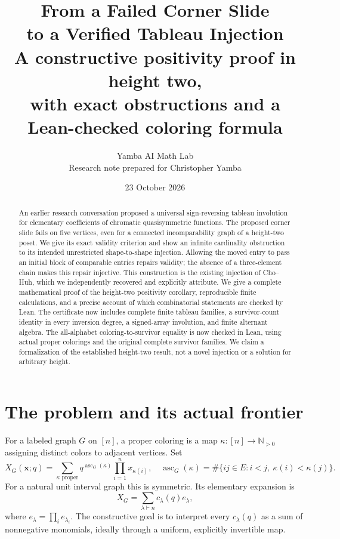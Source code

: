 \documentclass[11pt,a4paper]{article}
\title{\textcolor{ink}{From a Failed Corner Slide\\to a Verified Tableau Injection}\\[3mm]
\large A constructive positivity proof in height two,\\with exact obstructions and a Lean-checked coloring formula}
\author{Yamba AI Math Lab\\\small Research note prepared for Christopher Yamba}
\date{23 October 2026}
\theoremstyle{definition}
\newcommand{\N}{\mathbb N}
\begin{document}
\maketitle
\begin{abstract}
An earlier research conversation proposed a universal sign-reversing tableau
involution for elementary coefficients of chromatic quasisymmetric functions.
The proposed corner slide fails on five vertices, even for a connected
incomparability graph of a height-two poset. We give its exact validity
criterion and show an infinite cardinality obstruction to its intended
unrestricted shape-to-shape injection. Allowing the moved entry to pass an
initial block of comparable entries repairs validity; the absence of a
three-element chain makes this repair injective. This construction is the
existing injection of Cho--Huh, which we independently recovered and explicitly
attribute. We give a complete mathematical proof of the height-two positivity
corollary, reproducible finite calculations, and a precise account of which
combinatorial statements are checked by Lean. The certificate now includes
complete finite tableau families, a survivor-count identity in every
inversion degree, a signed-array involution, and finite alternant algebra.
The all-alphabet coloring-to-survivor equality is now checked in Lean, using
actual proper colorings and the original complete survivor families. We claim
a formalization of the established height-two result, not a novel injection
or a solution for arbitrary height.
\end{abstract}

\begin{center}
\end{center}

\section{The problem and its actual frontier}

For a labeled graph $G$ on $[n]$, a proper coloring is a map
$\kappa:[n]\to\N_{>0}$ assigning distinct colors to adjacent vertices. Set
\[
 X_G(\mathbf x;q)=\sum_{\kappa\text{ proper}}
 q^{\operatorname{asc}_G(\kappa)}\prod_{i=1}^n x_{\kappa(i)},
 \quad
 \operatorname{asc}_G(\kappa)=\#\{ij\in E:i<j,\ \kappa(i)<\kappa(j)\}.
\]
For a natural unit interval graph this is symmetric. Its elementary expansion is
\[
 X_G=\sum_{\lambda\vdash n}c_\lambda(q)e_\lambda,
\]
where
$e_\lambda=\prod_i e_{\lambda_i}$.
The constructive goal is to interpret every $c_\lambda(q)$ as a sum of
nonnegative monomials, ideally through a uniform, explicitly invertible map.
\end{document}

